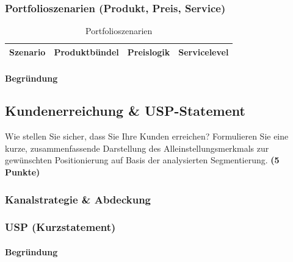 \documentclass[
%
ngerman %
%
numeric %
]{wbh-assignment}
\begin{document}
\subsubsection{Portfolioszenarien (Produkt, Preis, Service)}
\begin{table}[htb!]
\centering
\caption{Portfolioszenarien}
\begin{tabular}{l l l l}
\textbf{Szenario} & \textbf{Produktbündel} & \textbf{Preislogik} & \textbf{Servicelevel} \\
\hline
\end{tabular}
\end{table}

\paragraph{Begründung}

\subsection{Kundenerreichung \& USP-Statement}
\begin{aufgabenstellung}
Wie stellen Sie sicher, dass Sie Ihre Kunden erreichen? Formulieren Sie eine kurze, zusammenfassende Darstellung des Alleinstellungsmerkmals zur gewünschten Positionierung auf Basis der analysierten Segmentierung. \textbf{(5 Punkte)}
\end{aufgabenstellung}

\vspace*{5mm}

\subsubsection{Kanalstrategie \& Abdeckung}

\subsubsection{USP (Kurzstatement)}

\paragraph{Begründung}
\end{document}
